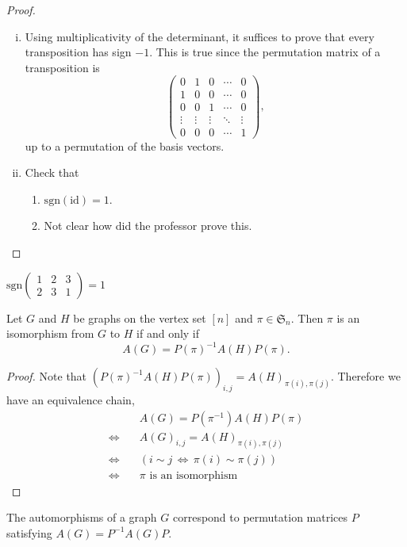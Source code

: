 \begin{proof}
\begin{enumerate}[(i)]
\item Using multiplicativity of the determinant, it suffices to prove that every transposition has sign $-1$. This is true since the permutation matrix of a transposition is
\[
\begin{pmatrix}
0&1&0&\cdots&0\\
1&0&0&\cdots&0\\
0&0&1&\cdots&0\\
\vdots &\vdots&\vdots&\ddots&\vdots\\
0&0&0&\cdots&1
\end{pmatrix}
,\]
up to a permutation of the basis vectors.
\item Check that 
\begin{enumerate}
\item $\mathrm{sgn}(\mathrm{id})=1$.
\item \color{red}Not clear how did the professor prove this. 
\end{enumerate}
\end{enumerate}
\end{proof}

\begin{example}
$\mathrm{sgn}\begin{pmatrix}
1&2&3\\
2&3&1
\end{pmatrix}=1$
\end{example}

\begin{proposition}
Let $G$ and $H$ be graphs on the vertex set $[n]$ and $\pi\in\mathfrak{S}_n$. Then $\pi$ is an isomorphism from $G$ to $H$ if and only if 
 \[A(G)=P(\pi)^{-1}A(H)P(\pi).\]
\end{proposition}
\begin{proof}
Note that $(P(\pi)^{-1}A(H)P(\pi))_{i,j}=A(H)_{\pi(i),\pi(j)}.$ Therefore we have an equivalence chain,
\begin{align*}
&A(G)=P(\pi^{-1})A(H)P(\pi)\\
\Longleftrightarrow\quad & A(G)_{i,j}=A(H)_{\pi(i),\pi(j)}\\
\Longleftrightarrow\quad & (i\sim j\,\Longleftrightarrow\,\pi(i)\sim\pi(j))\\
\Longleftrightarrow\quad &\pi \textrm{ is an isomorphism}
\end{align*}
\end{proof}

\begin{corollary}
The automorphisms of a graph $G$ correspond to permutation matrices $P$ satisfying $A(G)=P^{-1}A(G)P$.
\end{corollary}

